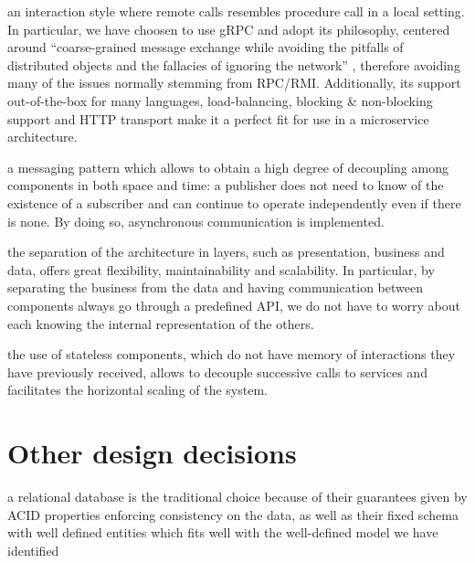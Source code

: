 \begin{description}[leftmargin=0pt]
    \item[RPC:] an interaction style where remote calls resembles procedure call in a local setting. In particular, we have
          choosen to use gRPC and adopt its philosophy, centered around ``coarse-grained message exchange while avoiding the
          pitfalls of distributed objects and the fallacies of ignoring the network'' \cite{gRPCPrinciples}, therefore
          avoiding many of the issues normally stemming from RPC/RMI. Additionally, its support out-of-the-box for many
          languages, load-balancing, blocking \& non-blocking support and HTTP transport make it a perfect fit for use in a
          microservice architecture.
    \item[Pub-sub/Message queueing:] a messaging pattern which allows to obtain a high degree of decoupling among components
          in both space and time: a publisher does not need to know of the existence of a subscriber and can continue to
          operate independently even if there is none. By doing so, asynchronous communication is implemented.
    \item[Tiered architecture:] the separation of the architecture in layers, such as presentation, business and data,
          offers great flexibility, maintainability and scalability. In particular, by separating the business from the data
          and having communication between components always go through a predefined API, we do not have to worry about
          each knowing the internal representation of the others.
    \item[Stateless components:] the use of stateless components, which do not have memory of interactions they have previously
          received, allows to decouple successive calls to services and facilitates the horizontal scaling of the system.
\end{description}

\section{Other design decisions}
\begin{description}[leftmargin=0pt]
    \item[Relational DBMS:]
          a relational database is the traditional choice because of their guarantees given by ACID properties
          enforcing consistency on the data, as well as their fixed schema with well defined entities which fits
          well with the well-defined model we have identified
\end{description}
